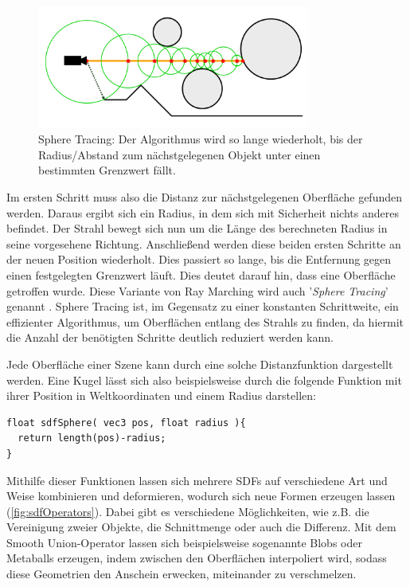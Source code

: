\begin{figure}[h]
	\centering
	\includegraphics[width=0.80\textwidth]{Grafiken/Basics/Volume/Sphere_Tracing.png}
	\begin{footnotesize}
		\caption{Sphere Tracing: Der Algorithmus wird so lange wiederholt, bis der Radius/Abstand zum nächstgelegenen
			Objekt unter einen bestimmten Grenzwert fällt.}
	\end{footnotesize}
\end{figure}


Im ersten Schritt muss also die Distanz zur nächstgelegenen Oberfläche gefunden werden. Daraus ergibt sich ein Radius, in dem sich
mit Sicherheit nichts anderes befindet. Der Strahl bewegt sich nun um die Länge des berechneten Radius in seine vorgesehene Richtung.
Anschließend werden diese beiden ersten Schritte an der neuen Position wiederholt. Dies passiert so lange, bis die Entfernung gegen einen festgelegten
Grenzwert läuft. Dies deutet darauf hin, dass eine Oberfläche getroffen wurde. Diese Variante von Ray Marching wird auch
'\textit{Sphere Tracing}' genannt \parencite{Hart96}. Sphere Tracing ist, im Gegensatz zu einer konstanten Schrittweite, ein effizienter Algorithmus,
um Oberflächen entlang des Strahls zu finden, da hiermit die Anzahl der benötigten Schritte deutlich reduziert werden kann.

Jede Oberfläche einer Szene kann durch eine solche Distanzfunktion dargestellt werden.
Eine Kugel lässt sich also beispielsweise durch die folgende Funktion mit ihrer Position in Weltkoordinaten und einem Radius darstellen:

\vspace{0.5cm}
\begin{lstlisting}[language={[Sharp]C}, label={lst:sphereSDF}, caption={SDF einer Kugel im Ursprung},captionpos=b, frame=single]
float sdfSphere( vec3 pos, float radius ){
  return length(pos)-radius;
}
\end{lstlisting}

Mithilfe dieser Funktionen lassen sich mehrere SDFs auf verschiedene Art und Weise kombinieren und deformieren, wodurch sich neue Formen
erzeugen lassen (\autoref{fig:sdfOperators}).
Dabei gibt es verschiedene Möglichkeiten, wie z.B. die Vereinigung zweier Objekte, die Schnittmenge oder auch die Differenz.
Mit dem Smooth Union-Operator lassen sich beispielsweise sogenannte Blobs oder Metaballs erzeugen, indem zwischen
den Oberflächen interpoliert wird, sodass diese Geometrien den Anschein erwecken, miteinander zu verschmelzen.

